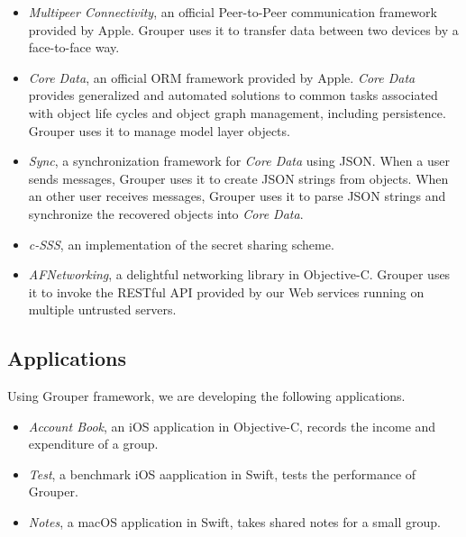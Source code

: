 \documentclass[twocolumn,10pt]{article}
\begin{document}
\begin{itemize}
	\setlength{\itemsep}{1pt}
	\setlength{\parskip}{0pt}
	\setlength{\parsep}{0pt}
	\item 
	\emph{Multipeer Connectivity}\cite{mc},  an official Peer-to-Peer communication framework provided by Apple. 
	Grouper uses it to transfer data between two devices by a face-to-face way.
	\item 
	\emph{Core Data}\cite{coredata}, an official ORM framework provided by Apple.
	\emph{Core Data} provides generalized and automated solutions to common tasks associated with object life cycles and object graph management, including persistence. 
	Grouper uses it to manage model layer objects. 
	\item 
	\emph{Sync}\cite{sync}, a synchronization framework for \emph{Core Data} using JSON. 
	When a user sends messages, Grouper uses it to create JSON strings from objects. 
	When an other user receives messages, Grouper uses it to parse JSON strings and synchronize the recovered objects into \emph{Core Data}.
	\item 
	\emph{c-SSS}\cite{c-sss}, an implementation of the secret sharing scheme.
	\item 
	\emph{AFNetworking}\cite{afnetworking}, a delightful networking library in Objective-C. 
	Grouper uses it to invoke the RESTful API provided by our Web services running on multiple untrusted servers. 
\end{itemize}

\subsection{Applications}

Using Grouper framework, we are developing the following applications. 

\begin{itemize}
	\setlength{\itemsep}{1pt}
	\setlength{\parskip}{0pt}
	\setlength{\parsep}{0pt}
	\item \emph{Account Book}, an iOS application in Objective-C, records the income and expenditure of a group.
	\item \emph{Test}, a benchmark iOS aapplication in Swift, tests the performance of Grouper.
	\item \emph{Notes}, a macOS application in Swift, takes shared notes for a small group.
\end{itemize}
\end{document}
